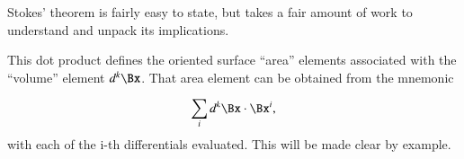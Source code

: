 %
%
Stokes' theorem is fairly easy to state, but takes a fair amount of work to understand and unpack its implications.



This dot product defines the oriented surface ``area'' elements associated with the ``volume'' element \( d^k \Bx \).
That area element can be obtained from the mnemonic

\begin{dmath}\label{eqn:statement:1561}
\sum_i d^k \Bx \cdot \Bx^i,
\end{dmath}
with each of the i-th differentials evaluated.
This will be made clear by example.

